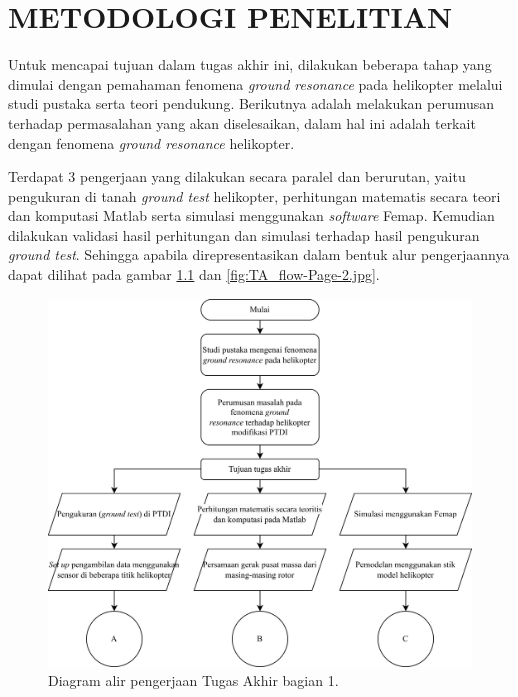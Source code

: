 \chapter{METODOLOGI PENELITIAN}
\label{chap:metodologipenelitian}

\thispagestyle{newchap}
Untuk mencapai tujuan dalam tugas akhir ini, dilakukan beberapa tahap yang dimulai dengan pemahaman fenomena \textit{ground resonance} pada helikopter melalui studi pustaka serta teori pendukung. Berikutnya adalah melakukan perumusan terhadap permasalahan yang akan diselesaikan, dalam hal ini adalah terkait dengan fenomena \textit{ground resonance} helikopter.

Terdapat 3 pengerjaan yang dilakukan secara paralel dan berurutan, yaitu pengukuran di tanah \textit{ground test} helikopter, perhitungan matematis secara teori dan komputasi Matlab serta simulasi menggunakan \textit{software} Femap. Kemudian dilakukan validasi hasil perhitungan dan simulasi terhadap hasil pengukuran \textit{ground test}. Sehingga apabila direpresentasikan dalam bentuk alur pengerjaannya dapat dilihat pada gambar \ref{fig:TA_flow-Page-1.jpg} dan \ref{fig:TA_flow-Page-2.jpg}.
 
\begin{figure}[h!]
	\centering
	\includegraphics[width=\textwidth]{gambar/TA_flow-Page-1.jpg}
	\caption{Diagram alir pengerjaan Tugas Akhir bagian 1.}
	\label{fig:TA_flow-Page-1.jpg}
\end{figure}

